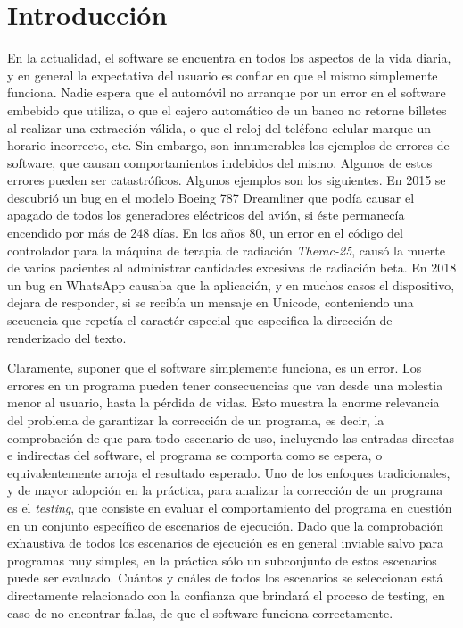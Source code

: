 \chapter{Introducci\'on}
\label{cap:introduccion}

En la actualidad, el software se encuentra en todos los aspectos de la vida diaria, y en general la expectativa del usuario es confiar en que el mismo simplemente funciona. Nadie espera que el autom\'ovil no arranque por un error en el software embebido que utiliza, o que el cajero autom\'atico de un banco no retorne billetes al realizar una extracci\'on v\'alida, o que el reloj del tel\'efono celular marque un horario incorrecto, etc. Sin embargo, son innumerables los ejemplos de errores de software, que causan comportamientos indebidos del mismo. Algunos de estos errores pueden ser catastr\'oficos. Algunos ejemplos son los siguientes. En 2015 se descubri\'o un bug en el modelo Boeing 787 Dreamliner que pod\'ia causar el apagado de todos los generadores el\'ectricos del avi\'on, si \'este permanec\'ia encendido por m\'as de 248 d\'ias. En los a\~nos 80, un error en el c\'odigo del controlador para la m\'aquina de terapia de radiaci\'on \emph{Therac-25}, caus\'o la muerte de varios pacientes al administrar cantidades excesivas de radiaci\'on beta. En 2018 un bug en WhatsApp causaba que la aplicaci\'on, y en muchos casos el dispositivo, dejara de responder, si se recib\'ia un mensaje en Unicode, conteniendo una secuencia que repet\'ia el caract\'er especial que especifica la direcci\'on de renderizado del texto.

Claramente, suponer que el software simplemente funciona, es un error. Los errores en un programa pueden tener consecuencias que van desde una molestia menor al usuario, hasta la p\'erdida de vidas. Esto muestra la enorme relevancia del problema de garantizar la correcci\'on de un programa, es decir, la comprobaci\'on de que para todo escenario de uso, incluyendo las entradas directas e indirectas del software, el programa se comporta como se espera, o equivalentemente arroja el resultado esperado. Uno de los enfoques tradicionales, y de mayor adopci\'on en la pr\'actica, para analizar la correcci\'on de un programa es el \emph{testing}, que consiste en evaluar el comportamiento del programa en cuesti\'on en un conjunto espec\'ifico de escenarios de ejecuci\'on. Dado que la comprobaci\'on exhaustiva de todos los escenarios de ejecuci\'on es en general inviable salvo para programas muy simples, en la pr\'actica s\'olo un subconjunto de estos escenarios puede ser evaluado. Cu\'antos y cu\'ales de todos los escenarios se seleccionan est\'a directamente relacionado con la confianza que brindar\'a el proceso de testing, en caso de no encontrar fallas, de que el software funciona correctamente.

